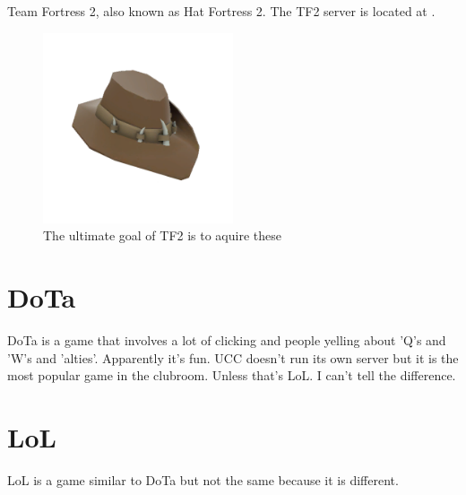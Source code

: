 Team Fortress 2, also known as Hat Fortress 2. The TF2 server is located at .

\begin{figure}[H]
	\centering
	\includegraphics[width=0.5\textwidth]{figures/tf2_hat.png}
	\caption{The ultimate goal of TF2 is to aquire these}
	\label{tf2_hat.png}
\end{figure}


\section{DoTa}

DoTa is a game that involves a lot of clicking and people yelling about 'Q's and 'W's and 'alties'. Apparently it's fun. UCC doesn't run its own server but it is the most popular game in the clubroom. Unless that's LoL. I can't tell the difference.

\section{LoL}

LoL is a game similar to DoTa but not the same because it is different.
